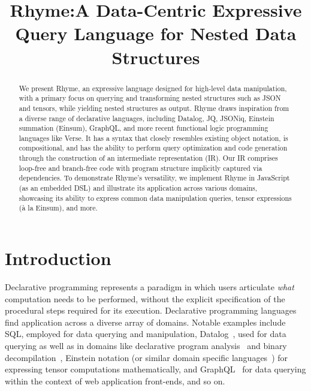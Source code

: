 \documentclass[runningheads]{llncs}
\newcommand{\lang}{Rhyme}
\begin{document}
%
\title{\lang{}:A Data-Centric Expressive Query Language for Nested Data Structures}

%
%
%
\maketitle              %
%
\begin{abstract}
We present \lang{},
an expressive language
designed for high-level data manipulation, with a primary focus on querying
and transforming nested structures such as JSON and tensors,
while yielding nested structures as output.
\lang{} draws inspiration from a diverse range of declarative languages,
including Datalog, JQ, JSONiq, Einstein summation (Einsum), GraphQL, and more
recent functional logic programming languages like Verse.
It has a syntax that closely resembles existing object notation,
is compositional, and has the ability to perform query optimization and
code generation through the construction of an intermediate
representation (IR).
Our IR comprises loop-free and branch-free code with program structure
implicitly captured via dependencies.
To demonstrate \lang{}'s versatility, 
we implement \lang{} in JavaScript (as an embedded DSL) and 
illustrate its application
across various domains, showcasing its ability to express common
data manipulation queries, tensor expressions (à la Einsum), and more.
\end{abstract}
%
%
%
\section{Introduction}\label{sec:intro}

Declarative programming represents a paradigm in which users articulate \emph{what}
computation needs to be performed, without the explicit specification of the
procedural steps required for its execution.
Declarative programming languages find application across a diverse array of
domains.
Notable examples include SQL, employed for data querying and manipulation,
Datalog~\cite{datalog}, used for data querying as well as in domains like
declarative program analysis~\cite{proganalysis_first, logic_proganalysis, souffle_cav}
and binary decompilation~\cite{ddissam}, Einstein notation (or similar domain
specific languages~\cite{tensor_comprehensions}) for expressing tensor computations
mathematically, and GraphQL~\cite{graphql} for data querying within the context of web application
front-ends, and so on.
\end{document}
